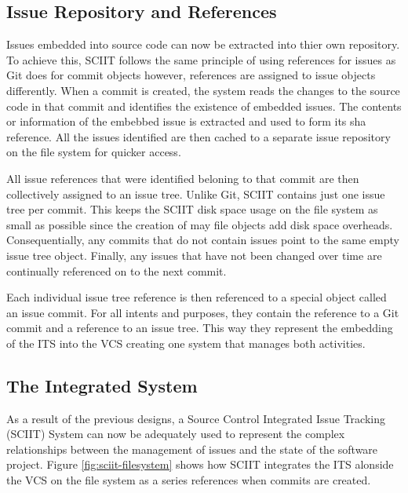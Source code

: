 \documentclass{mproj}
\begin{document}
\subsection{Issue Repository and References}

Issues embedded into source code can now be extracted into thier own repository. To achieve this, SCIIT follows the same principle of using references for issues as Git does for commit objects however, references are assigned to issue objects differently. When a commit is created, the system reads the changes to the source code in that commit and identifies the existence of embedded issues. The contents or information of the embebbed issue is extracted and used to form its sha reference. All the issues identified are then cached to a separate issue repository on the file system for quicker access. 

All issue references that were identified beloning to that commit are then collectively assigned to an issue tree. Unlike Git, SCIIT contains just one issue tree per commit. This keeps the SCIIT disk space usage on the file system as small as possible since the creation of may file objects add disk space overheads. Consequentially, any commits that do not contain issues point to the same empty issue tree object. Finally, any issues that have not been changed over time are continually referenced on to the next commit.

Each individual issue tree reference is then referenced to a special object called an issue commit. For all intents and purposes, they contain the reference to a Git commit and a reference to an issue tree. This way they represent the embedding of the ITS into the VCS creating one system that manages both activities. 




\subsection{The Integrated System}

As a result of the previous designs, a Source Control Integrated Issue Tracking (SCIIT) System can now be adequately used to represent the complex relationships between the management of issues and the state of the software project. Figure \ref{fig:sciit-filesystem} shows how SCIIT integrates the ITS alonside the VCS on the file system as a series references when commits are created.
\end{document}
